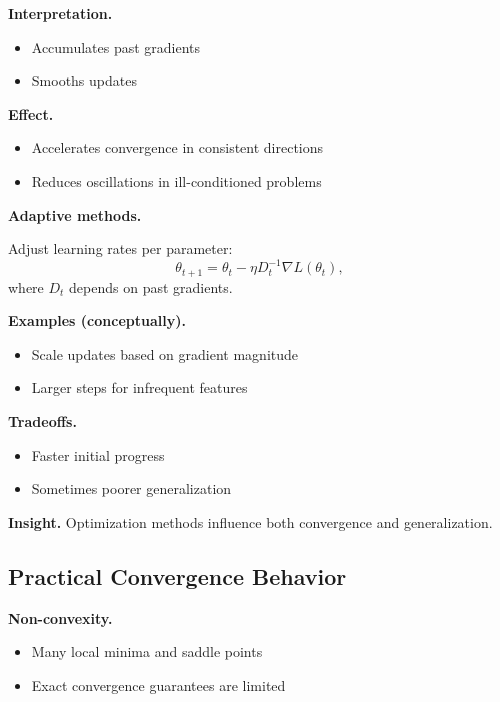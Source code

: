 \medskip

\noindent
\textbf{Interpretation.}
\begin{itemize}
    \item Accumulates past gradients
    \item Smooths updates
\end{itemize}

\medskip

\noindent
\textbf{Effect.}
\begin{itemize}
    \item Accelerates convergence in consistent directions
    \item Reduces oscillations in ill-conditioned problems
\end{itemize}

\medskip

\noindent
\textbf{Adaptive methods.}

Adjust learning rates per parameter:
\[
\theta_{t+1} = \theta_t - \eta D_t^{-1} \nabla L(\theta_t),
\]
where $D_t$ depends on past gradients.

\medskip

\noindent
\textbf{Examples (conceptually).}
\begin{itemize}
    \item Scale updates based on gradient magnitude
    \item Larger steps for infrequent features
\end{itemize}

\medskip

\noindent
\textbf{Tradeoffs.}
\begin{itemize}
    \item Faster initial progress
    \item Sometimes poorer generalization
\end{itemize}

\medskip

\noindent
\textbf{Insight.}  
Optimization methods influence both convergence and generalization.

\subsection{Practical Convergence Behavior}

\textbf{Non-convexity.}
\begin{itemize}
    \item Many local minima and saddle points
    \item Exact convergence guarantees are limited
\end{itemize}

